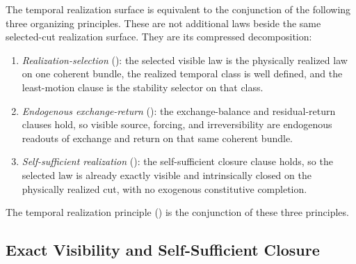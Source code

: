 \begin{proposition}
\label{rem:five-laws-three-principles}
The temporal realization surface is equivalent to the conjunction of the
following three organizing principles. These are not additional laws beside the
same selected-cut realization surface. They are its compressed decomposition:
\begin{tcolorbox}[colback=black!2, colframe=black!35, title={Three Master Principles}]
\begin{enumerate}[label=(\roman*), leftmargin=2em, itemsep=0.2em]
\item \emph{Realization-selection}
      (): the selected visible law is the
      physically realized law on one coherent bundle, the realized temporal
      class is well defined, and the least-motion clause is the stability
      selector on that class.
\item \emph{Endogenous exchange-return}
      (): the exchange-balance and
      residual-return clauses hold, so visible source, forcing, and
      irreversibility are endogenous readouts of exchange and return on that
      same coherent bundle.
\item \emph{Self-sufficient realization}
      (): the self-sufficient closure
      clause holds, so the selected law is already exactly visible and
      intrinsically closed on the physically realized cut, with no exogenous
      constitutive completion.
\end{enumerate}
\end{tcolorbox}
The temporal realization principle
() is the conjunction of these three
principles.
\end{proposition}

\subsection{Exact Visibility and Self-Sufficient Closure}

